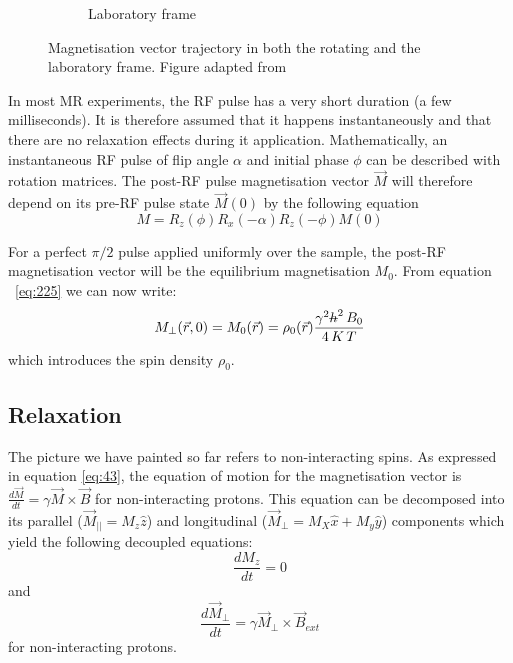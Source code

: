 \begin{figure}[ht]
\begin{subfigure}[b]{0.4\textwidth}
        \caption{Laboratory frame}
        \label{fig:ch3spintrajb}
    \end{subfigure}
    
    \caption{Magnetisation vector trajectory in both the rotating and the laboratory frame. Figure adapted from \cite{Haacke1999}}
    \label{fig:ch3spintrajboth}
\end{figure}

\hfill

In most MR experiments, the RF pulse has a very short duration (a few milliseconds).
It is therefore assumed that it happens instantaneously and that there are no relaxation effects during it application.
Mathematically, an instantaneous RF pulse of flip angle $\alpha$ and initial phase $\phi$ can be described with rotation matrices.
The post-RF pulse magnetisation vector $\vec{M}$ will therefore depend on its pre-RF pulse state $\vec{M}(0)$ by the following equation
\begin{equation} \label{eq:445}
    M = R_z(\phi) R_x(-\alpha) R_z(-\phi) M(0)
\end{equation}

For a perfect $\pi/2$ pulse applied uniformly over the sample, the post-RF magnetisation vector will be the equilibrium magnetisation $M_0$. 
From equation ~\ref{eq:225} we can now write:
\begin{equation}\label{eq:93}
    M_{\perp}(\vec{r},0) = M_0(\vec{r}) = \rho_0(\vec{r}) \frac{\gamma^2 \text{\sout{$h$}}^2 \, B_0}{4 \, K \, T}
\end{equation}
which introduces the spin density $\rho_0$.

\hfill

\subsection{Relaxation}

The picture we have painted so far refers to non-interacting spins.
As expressed in equation \ref{eq:43}, the equation of motion for the magnetisation vector is $\frac{d\vec{M}}{dt} = \gamma \vec{M} \times \vec{B}$  for non-interacting protons. 
This equation can be decomposed into its parallel ($\vec{M}_{||} = M_z \hat{z}$) and longitudinal ($\vec{M}_{\perp} = M_X \hat{x} + M_y \hat{y}$) components which yield the following decoupled equations:
\begin{equation}\label{eq:46}
    \frac{d M_z}{dt} = 0
\end{equation}
and 
\begin{equation}\label{eq:47}
    \frac{d \vec{M}_{\perp}}{dt} = \gamma \vec{M}_{\perp} \times \vec{B}_{ext}
\end{equation}
for non-interacting protons.


